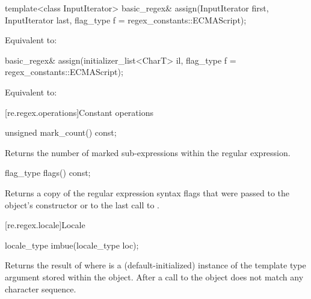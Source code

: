 %
\begin{itemdecl}
template<class InputIterator>
  basic_regex& assign(InputIterator first, InputIterator last,
                      flag_type f = regex_constants::ECMAScript);
\end{itemdecl}

\begin{itemdescr}
\pnum
\effects
Equivalent to: 
\end{itemdescr}

%
\begin{itemdecl}
basic_regex& assign(initializer_list<CharT> il,
                    flag_type f = regex_constants::ECMAScript);
\end{itemdecl}

\begin{itemdescr}
\pnum
\effects
Equivalent to: 
\end{itemdescr}


[re.regex.operations]{Constant operations}

%
\begin{itemdecl}
unsigned mark_count() const;
\end{itemdecl}

\begin{itemdescr}
\pnum
\effects
Returns the number of marked sub-expressions within the
regular expression.
\end{itemdescr}

%
\begin{itemdecl}
flag_type flags() const;
\end{itemdecl}

\begin{itemdescr}
\pnum
\effects
Returns a copy of the regular expression syntax flags that
were passed to the object's constructor or to the last call
to .
\end{itemdescr}

[re.regex.locale]{Locale}%

%
\begin{itemdecl}
locale_type imbue(locale_type loc);
\end{itemdecl}

\begin{itemdescr}
\pnum
\effects
Returns the result of  where
 is a (default-initialized) instance of the template
type argument  stored within the object.  After a call
to  the  object does not match any
character sequence.
\end{itemdescr}

